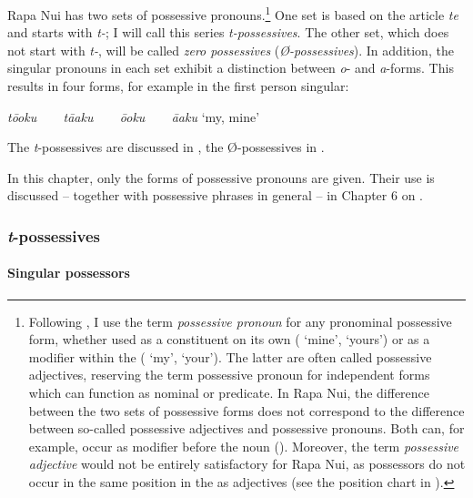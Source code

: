 Rapa Nui has two sets of possessive pronouns.\footnote{\label{fn:162}Following \citet[182]{Dryer2007Noun}, I use the term \textit{possessive pronoun} for any pronominal possessive form, whether used as a constituent on its own ( ‘mine’, ‘yours’) or as a modifier within the  ( ‘my’, ‘your’). The latter are often called possessive adjectives, reserving the term possessive pronoun for independent forms which can function as nominal  or predicate. In Rapa Nui, the difference between the two sets of possessive forms does not correspond to the difference between so-called possessive adjectives and possessive pronouns. Both can, for example, occur as modifier before the noun (). Moreover, the term \textit{possessive adjective} would not be entirely satisfactory for Rapa Nui, as possessors do not occur in the same position in the  as adjectives (see the position chart in ).} One set is based on the article \textit{te} and starts with \textit{t-}; I will call this series \textit{t-possessives}. The other set, which does not start with \textit{t\nobreakdash-}, will be called \textit{zero possessives} (\textit{Ø-possessives}). In addition, the singular pronouns in each set exhibit a distinction between \textit{o}{}- and \textit{a}{}-forms. This results in four forms, for example in the first person singular:

\ea
 \textit{tō{\ꞌ}oku  ~ ~   tā{\ꞌ}aku  ~ ~   ō{\ꞌ}oku   ~ ~ {\ꞌ}ā{\ꞌ}aku   }  ‘my, mine’
\z

The \textit{t}{}-possessives are discussed in , the Ø-possessives in .

In this chapter, only the forms of possessive pronouns are given. Their use is discussed – together with possessive phrases in general – in Chapter 6 on .

\subsubsection[T{}-possessives]{\textit{t}{}-possessives}\label{sec:4.2.2.1}
\paragraph{Singular possessors}\label{sec:4.2.2.1.1}

